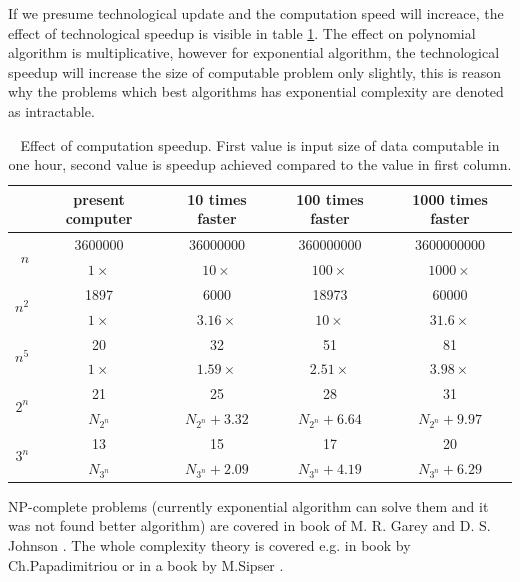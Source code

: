 If we presume technological update and the computation speed will increace, the effect of technological speedup is visible in table \ref{table:speedupeffect}. The effect on polynomial algorithm is multiplicative, however for exponential algorithm, the technological speedup will increase the size of computable problem only slightly, this is reason why the problems which best algorithms has exponential complexity are denoted as intractable. 
\begin{table}[ht]
\footnotesize
\begin{tabular}{r|c|c|c|c|}
                      & present computer   & 10 times faster               & 100 times faster               & 1000 times faster \\
\hline
\multirow{2}{*}{$n$}  & 3600000        & 36000000         & 360000000        & 3600000000      \\
                      & $1\times$          & $10\times$   & $100\times$  & $1000\times$ \\
\hline
\multirow{2}{*}{$n^2$}                 & 1897 & 6000             & 18973 & 60000            \\
                      & $1\times$          & $3.16\times$ & $10\times$   & $31.6\times$ \\
\hline
\multirow{2}{*}{$n^5$}                 & 20  & 32     & 51    & 81    \\
                      & $1\times$          & $1.59\times$ & $2.51\times$ & $3.98\times$ \\
\hline
\multirow{2}{*}{$2^n$}                 & 21  & 25    & 28    & 31    \\
                      & $N_{2^n}$       & $N_{2^n}+3.32$    & $N_{2^n}+6.64$    & $N_{2^n}+9.97$    \\
\hline
\multirow{2}{*}{$3^n$} & 13  & 15    & 17    & 20    \\
                      & $N_{3^n}$       & $N_{3^n}+2.09$    & $N_{3^n}+4.19$     & $N_{3^n}+6.29$                  \\
                      \hline
\end{tabular}
\caption{ Effect of computation speedup. First value is input size of data computable in one hour, second value is speedup achieved compared to the value in first column. }
\label{table:speedupeffect}
\end{table}

NP-complete problems (currently exponential algorithm can solve them and it was not found better algorithm) are covered in book of M. R. Garey and D. S. Johnson \cite{Garey1979}. The whole complexity theory is covered e.g. in book by Ch.Papadimitriou \cite{Papadimitriou1995} or in a book by M.Sipser \cite{Sipser2012}. 

